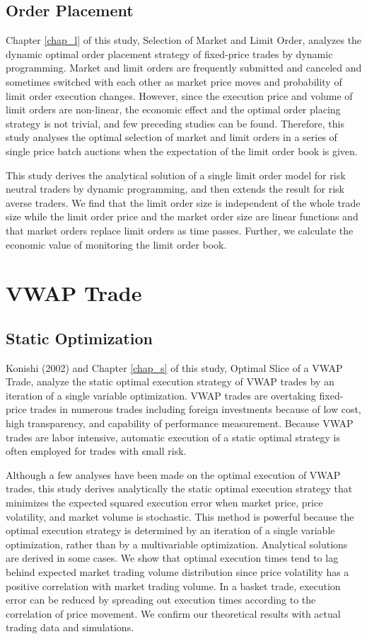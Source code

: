 \subsection{Order Placement}\label{sec_i12}
Chapter \ref{chap_l} of this study, Selection of Market and Limit Order, analyzes the dynamic optimal order placement strategy of fixed-price trades by dynamic programming.  Market and limit orders are frequently submitted and canceled and sometimes switched with each other as market price moves and probability of limit order execution changes.  However, since the execution price and volume of limit orders are non-linear, the economic effect and the optimal order placing strategy is not trivial, and few preceding studies can be found.  Therefore, this study analyses the optimal selection of market and limit orders in a series of single price batch auctions when the expectation of the limit order book is given.  

This study derives the analytical solution of a single limit order model for risk neutral traders by dynamic programming, and then extends the result for risk averse traders.  We find that the limit order size is independent of the whole trade size while the limit order price and the market order size are linear functions and that market orders replace limit orders as time passes.  Further, we calculate the economic value of monitoring the limit order book.


\section{VWAP Trade}\label{sec_i2}
\subsection{Static Optimization}\label{sec_i21}
Konishi (2002) and Chapter \ref{chap_s} of this study, Optimal Slice of a VWAP Trade, analyze the static optimal execution strategy of VWAP trades by an iteration of a single variable optimization.  VWAP trades are overtaking fixed-price trades in numerous trades including foreign investments because of low cost, high transparency, and capability of performance measurement.  Because VWAP trades are labor intensive, automatic execution of a static optimal strategy is often employed for trades with small risk.  

Although a few analyses have been made on the optimal execution of VWAP trades, this study derives analytically the static optimal execution strategy that minimizes the expected squared execution error when market price, price volatility, and market volume is stochastic.  This method is powerful because the optimal execution strategy is determined by an iteration of a single variable optimization, rather than by a multivariable optimization.  Analytical solutions are derived in some cases.  We show that optimal execution times tend to lag behind expected market trading volume distribution since price volatility has a positive correlation with market trading volume.  In a basket trade, execution error can be reduced by spreading out execution times according to the correlation of price movement.  We confirm our theoretical results with actual trading data and simulations.


